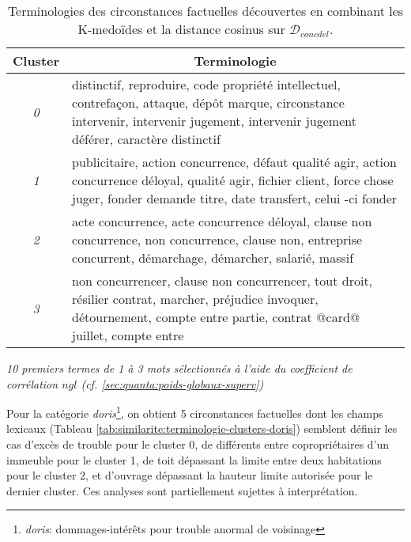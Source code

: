 \begin{table}[ht]
	\centering \scriptsize
	\begin{tabular}{|c|p{}|}
		\hline
		{Cluster} & \multicolumn{1}{|c|}{Terminologie} \\ \hline
		\textit{0} & distinctif, reproduire, code propriété intellectuel, contrefaçon, attaque, dépôt marque, circonstance intervenir, intervenir jugement, intervenir jugement déférer, caractère distinctif
		\\ \hline
		\textit{1} & publicitaire, action concurrence, défaut qualité agir, action concurrence déloyal, qualité agir, fichier client, force chose juger, fonder demande titre, date transfert, celui -ci fonder
		\\ \hline
		\textit{2} & acte concurrence, acte concurrence déloyal, clause non concurrence, non concurrence, clause non, entreprise concurrent, démarchage, démarcher, salarié, massif
		\\ \hline
		\textit{3} & non concurrencer, clause non concurrencer, tout droit, résilier contrat, marcher, préjudice invoquer, détournement, compte entre partie, contrat @card@ juillet, compte entre
		\\ \hline
	\end{tabular}
	
	\textit{10 premiers termes de 1 à 3 mots sélectionnés à l'aide du coefficient de corrélation $ngl$ (cf. \ref{sec:quanta:poids-globaux-superv})}
	\caption{Terminologies des circonstances factuelles découvertes en combinant les K-medoïdes et la distance cosinus sur $\mathcal{D}_{concdel}$.}\label{tab:similarite:terminologie-clusters-concdel}
\end{table}

Pour la catégorie \textit{doris}\footnote{\textit{doris}: dommages-intérêts pour trouble anormal de voisinage},  on obtient 5 circonstances factuelles dont les champs lexicaux (Tableau \ref{tab:similarite:terminologie-clusters-doris}) semblent définir les cas d'excès de trouble pour le cluster 0, de différents entre copropriétaires d'un immeuble pour le cluster 1, de toit dépassant la limite entre deux habitations pour le cluster 2, et d'ouvrage dépassant la hauteur limite autorisée pour le dernier cluster.%
 Ces analyses sont partiellement sujettes à interprétation.

